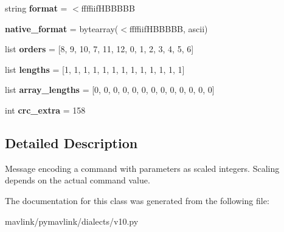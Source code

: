 \begin{DoxyCompactItemize}
\item 
\mbox{\label{classpymavlink_1_1dialects_1_1v10_1_1MAVLink__command__int__message_a9321c9d6c79be69eba474104cd6ef49c}} 
string {\bfseries format} = \textquotesingle{}$<$ffffiif\+H\+B\+B\+B\+BB\textquotesingle{}
\item 
\mbox{\label{classpymavlink_1_1dialects_1_1v10_1_1MAVLink__command__int__message_aa8f54e306b9ec8430d30e68484c14494}} 
{\bfseries native\+\_\+format} = bytearray(\textquotesingle{}$<$ffffiif\+H\+B\+B\+B\+BB\textquotesingle{}, \textquotesingle{}ascii\textquotesingle{})
\item 
\mbox{\label{classpymavlink_1_1dialects_1_1v10_1_1MAVLink__command__int__message_a71c886df6d3fb2642de4c70bc2526d7e}} 
list {\bfseries orders} = \mbox{[}8, 9, 10, 7, 11, 12, 0, 1, 2, 3, 4, 5, 6\mbox{]}
\item 
\mbox{\label{classpymavlink_1_1dialects_1_1v10_1_1MAVLink__command__int__message_ae5b768f750933323f39ba58fc366279d}} 
list {\bfseries lengths} = \mbox{[}1, 1, 1, 1, 1, 1, 1, 1, 1, 1, 1, 1, 1\mbox{]}
\item 
\mbox{\label{classpymavlink_1_1dialects_1_1v10_1_1MAVLink__command__int__message_a9a4a9816f09de7dcdc9b1dcc05387736}} 
list {\bfseries array\+\_\+lengths} = \mbox{[}0, 0, 0, 0, 0, 0, 0, 0, 0, 0, 0, 0, 0\mbox{]}
\item 
\mbox{\label{classpymavlink_1_1dialects_1_1v10_1_1MAVLink__command__int__message_a081274536593db6a946a274070a9c243}} 
int {\bfseries crc\+\_\+extra} = 158
\end{DoxyCompactItemize}


\subsection{Detailed Description}
\begin{DoxyVerb}Message encoding a command with parameters as scaled integers.
Scaling depends on the actual command value.
\end{DoxyVerb}
 

The documentation for this class was generated from the following file\+:\begin{DoxyCompactItemize}
\item 
mavlink/pymavlink/dialects/v10.\+py\end{DoxyCompactItemize}
